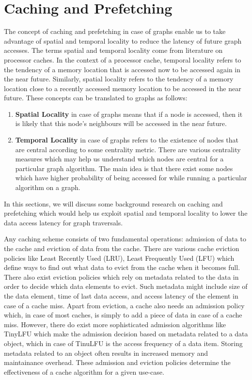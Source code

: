 \section{Caching and Prefetching}\label{sec:cachingDistSys}
The concept of caching and prefetching in case of graphs enable us to take
advantage of spatial and temporal locality to reduce the latency of future graph
accesses. The terms spatial and temporal locality come from literature on
processor caches. In the context of a processor cache, temporal locality refers
to the tendency of a memory location that is accessed now to be
accessed again in the near future. Similarly, spatial locality refers to the 
tendency of a memory location close to a recently accessed memory location to be
accessed in the near future. These concepts can be translated to graphs as
follows:
\begin{enumerate}
    \item \textbf{Spatial Locality} in case of graphs means that if a node is
        accessed, then it is likely that this node's neighbours will be accessed
        in the near future.
    \item \textbf{Temporal Locality} in case of graphs refers to the existence
        of nodes that are central according to some centrality metric. There are
        various centrality measures\cite{klein2010centrality} which may help us 
        understand which nodes are central for a particular graph algorithm. The
        main idea is that there exist some nodes which have higher probability
        of being accessed for while running a particular algorithm on a graph.
\end{enumerate}
In this sections, we will discuss some background research on caching and
prefetching which would help us exploit  spatial and temporal locality to lower
the data access latency for graph traversals.

\medskip
Any caching scheme consists of two fundamental operations: admission of
data to the cache and eviction of data from the cache. There are various cache
eviction policies like Least Recently Used (LRU), Least Frequently Used (LFU)
which define ways to find out what data to evict from the cache when it becomes
full. There also exist eviction policies which rely on metadata related to the
data in order to decide which data elements to evict. Such metadata might
include size of the data element, time of last data access, and access latency
of the element in case of a cache miss. Apart from eviction, a cache also needs
an admission policy which, in case of most caches, is simply to add a piece of
data in case of a cache miss. However, there do exist more sophisticated
admission algorithms like TinyLFU\cite{einziger2017tinylfu} which make the
admission decision based on metadata related to a data object, which in case of
TinuLFU is the access frequency of a data item. Storing metadata related to an
object often results in increased memory and maintainance overhead. These
admission and eviction policies determine the effectiveness of a cache algorithm
for a given use-case.

